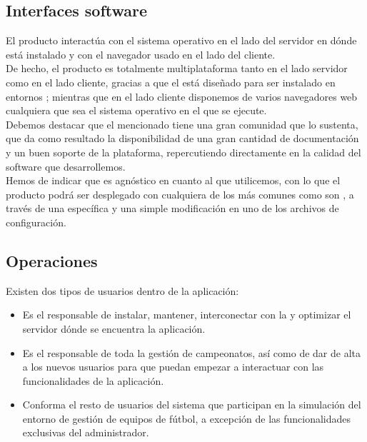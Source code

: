 \subsection{Interfaces software}
El producto interactúa con el sistema operativo en el lado del servidor en dónde
está instalado y con el navegador usado en el lado
del cliente.\\

De hecho, el producto es totalmente multiplataforma tanto en el lado servidor
como en el lado cliente, gracias a que el  está diseñado
para ser instalado en entornos ; mientras que
en el lado cliente disponemos de varios navegadores web cualquiera que sea el
sistema operativo en el que se
ejecute.\\

Debemos destacar que el mencionado  tiene una gran comunidad
que lo sustenta, que da como resultado la disponibilidad de una gran cantidad de
documentación y un buen soporte de la plataforma,
repercutiendo directamente en la calidad del software que desarrollemos.\\

Hemos de indicar que  es agnóstico en cuanto al  que
utilicemos, con lo que el producto podrá ser desplegado con cualquiera de los
 más comunes como son , a través de una  específica y una simple modificación
en uno de los archivos de configuración.

\subsection{Operaciones}
Existen dos tipos de usuarios dentro de la aplicación:

\begin{itemize}
\item {} Es el responsable de instalar, mantener,
  interconectar con la  y optimizar el servidor dónde se
  encuentra la aplicación.
\item {} Es el responsable de toda la gestión de
  campeonatos, así como de dar de alta a los nuevos usuarios para que puedan
  empezar a interactuar con las funcionalidades de la aplicación.
\item {} Conforma el resto de usuarios del sistema que
  participan en la simulación del entorno de gestión de equipos de fútbol, a
  excepción de las funcionalidades exclusivas del administrador.
\end{itemize}

